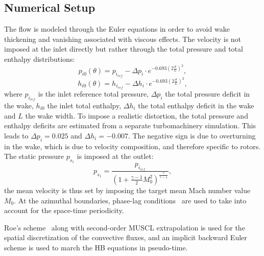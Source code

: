 \subsection{Numerical Setup}

The flow is modeled through the 
Euler equations in order to avoid wake thickening and vanishing
associated with viscous effects. 
The velocity is not imposed at the inlet directly
but rather through the total pressure and total enthalpy distributions:
\begin{equation}
  \label{eq:rotatingblocks_ptot}
    p_{i0} (\theta) = p_{i_{ref}} - 
        \Delta p_i \cdot e^{
          -0.693 \left( 2 \frac{\theta}{L} \right) ^ 2},
\end{equation}
\begin{equation}
  \label{eq:rotatingblocks_htot}
    h_{i0} (\theta) = h_{i_{ref}} - 
        \Delta h_i \cdot e^{
          -0.693 \left( 2 \frac{\theta}{L} \right) ^ 2},
\end{equation}
where $p_{i_{ref}}$ is the inlet reference total pressure, $\Delta p_i$ the total pressure
deficit in the wake,
$h_{i0}$ the inlet total enthalpy, $\Delta h_i$ the total enthalpy
deficit in the wake and $L$ the wake width.
To impose a realistic distortion, the total pressure and
enthalpy deficits are estimated from a separate turbomachinery simulation.
This leads to $\Delta p_i = 0.025$ and 
$\Delta h_i = - 0.007$.
The negative sign is due to overturning in the wake, which
is due to velocity composition, and therefore specific to rotors.
The static pressure $p_{s_1}$ is imposed at the outlet:
\begin{equation}
    p_{s_1} = \frac{p_{i_{ref}}}{\left(1 + 
    \frac{\gamma - 1}{2} M_{0}^2 \right) ^ {\frac{\gamma}{ \gamma - 1}}} ,
\end{equation}
the mean velocity is thus set by imposing the
target mean Mach number value $M_{0}$.
At the azimuthal boundaries, phase-lag conditions~\cite{Erdos1977} 
are used to take into account for the space-time periodicity.

Roe's scheme~\cite{Roe1981} along with second-order MUSCL extrapolation 
is used for the spatial discretization of
the convective fluxes, and an implicit backward Euler scheme is used
to march the HB equations in pseudo-time.

